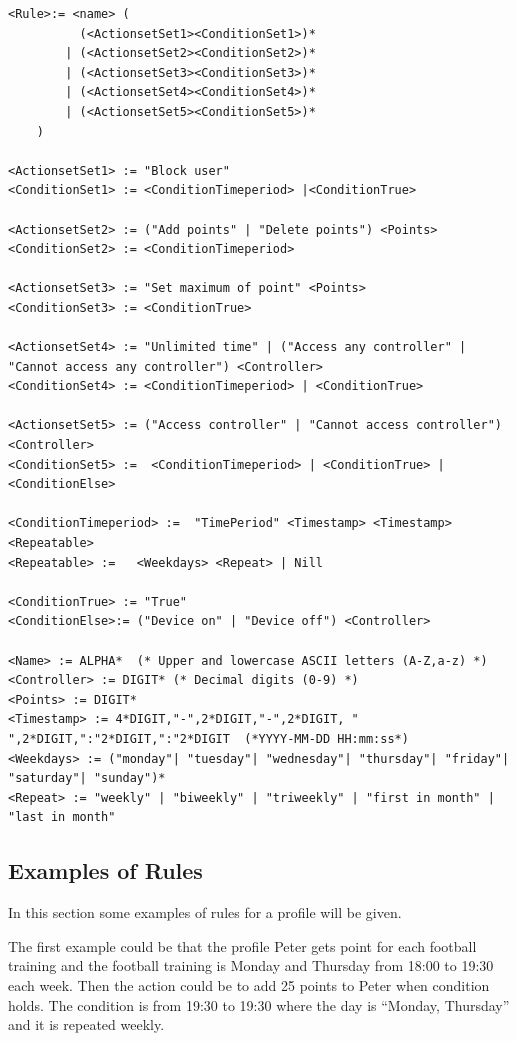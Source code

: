 \begin{lstlisting}[label=grammar2, caption=Grammar of a rule in EBNF]
<Rule>:= <name> (
	 	  (<ActionsetSet1><ConditionSet1>)*
		| (<ActionsetSet2><ConditionSet2>)*
		| (<ActionsetSet3><ConditionSet3>)*
		| (<ActionsetSet4><ConditionSet4>)*
		| (<ActionsetSet5><ConditionSet5>)*
	)

<ActionsetSet1> := "Block user" 
<ConditionSet1> := <ConditionTimeperiod> |<ConditionTrue>

<ActionsetSet2> := ("Add points" | "Delete points") <Points>
<ConditionSet2> := <ConditionTimeperiod>

<ActionsetSet3> := "Set maximum of point" <Points>
<ConditionSet3> := <ConditionTrue>

<ActionsetSet4> := "Unlimited time" | ("Access any controller" | "Cannot access any controller") <Controller>
<ConditionSet4> := <ConditionTimeperiod> | <ConditionTrue> 

<ActionsetSet5> := ("Access controller" | "Cannot access controller")<Controller>
<ConditionSet5> :=	<ConditionTimeperiod> |	<ConditionTrue>	|	<ConditionElse>	
				
<ConditionTimeperiod> :=  "TimePeriod" <Timestamp> <Timestamp> <Repeatable>					
<Repeatable> :=   <Weekdays> <Repeat> | Nill

<ConditionTrue> := "True" 
<ConditionElse>:= ("Device on" | "Device off") <Controller>
				
<Name> := ALPHA*  (* Upper and lowercase ASCII letters (A-Z,a-z) *)
<Controller> := DIGIT* (* Decimal digits (0-9) *)
<Points> := DIGIT*
<Timestamp> := 4*DIGIT,"-",2*DIGIT,"-",2*DIGIT, " ",2*DIGIT,":"2*DIGIT,":"2*DIGIT  (*YYYY-MM-DD HH:mm:ss*)
<Weekdays> := ("monday"| "tuesday"| "wednesday"| "thursday"| "friday"| "saturday"| "sunday")*
<Repeat> := "weekly" | "biweekly" | "triweekly" | "first in month" | "last in month"
\end{lstlisting}
		
\subsection{Examples of Rules}
In this section some examples of rules for a profile will be given.

The first example could be that the profile Peter gets point for each football training and the football training is Monday and Thursday from 18:00 to 19:30 each week. Then the action could be to add 25 points to Peter when condition holds. The condition is from 19:30 to 19:30 where the day is ``Monday, Thursday'' and it is repeated weekly. \\

